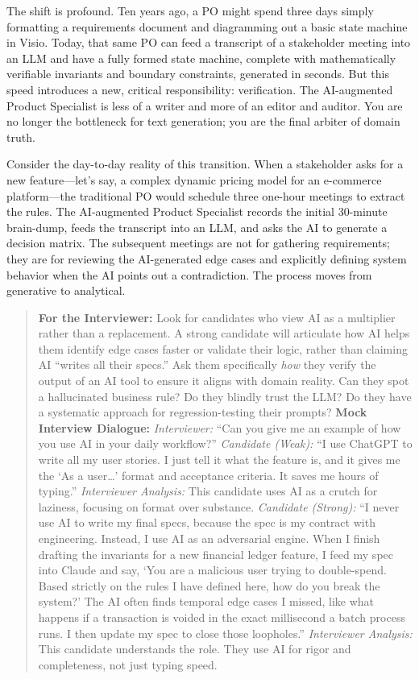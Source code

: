 The shift is profound. Ten years ago, a PO might spend three days simply
formatting a requirements document and diagramming out a basic state
machine in Visio. Today, that same PO can feed a transcript of a
stakeholder meeting into an LLM and have a fully formed state machine,
complete with mathematically verifiable invariants and boundary
constraints, generated in seconds. But this speed introduces a new,
critical responsibility: verification. The AI-augmented Product
Specialist is less of a writer and more of an editor and auditor. You
are no longer the bottleneck for text generation; you are the final
arbiter of domain truth.

Consider the day-to-day reality of this transition. When a stakeholder
asks for a new feature---let's say, a complex dynamic pricing model for
an e-commerce platform---the traditional PO would schedule three
one-hour meetings to extract the rules. The AI-augmented Product
Specialist records the initial 30-minute brain-dump, feeds the
transcript into an LLM, and asks the AI to generate a decision matrix.
The subsequent meetings are not for gathering requirements; they are for
reviewing the AI-generated edge cases and explicitly defining system
behavior when the AI points out a contradiction. The process moves from
generative to analytical.

\begin{quote}
\textbf{For the Interviewer:} Look for candidates who view AI as a
multiplier rather than a replacement. A strong candidate will articulate
how AI helps them identify edge cases faster or validate their logic,
rather than claiming AI ``writes all their specs.'' Ask them
specifically \emph{how} they verify the output of an AI tool to ensure
it aligns with domain reality. Can they spot a hallucinated business
rule? Do they blindly trust the LLM? Do they have a systematic approach
for regression-testing their prompts? \textbf{Mock Interview Dialogue:}
\emph{Interviewer:} ``Can you give me an example of how you use AI in
your daily workflow?'' \emph{Candidate (Weak):} ``I use ChatGPT to write
all my user stories. I just tell it what the feature is, and it gives me
the `As a user\ldots{}' format and acceptance criteria. It saves me
hours of typing.'' \emph{Interviewer Analysis:} This candidate uses AI
as a crutch for laziness, focusing on format over substance.
\emph{Candidate (Strong):} ``I never use AI to write my final specs,
because the spec is my contract with engineering. Instead, I use AI as
an adversarial engine. When I finish drafting the invariants for a new
financial ledger feature, I feed my spec into Claude and say, `You are a
malicious user trying to double-spend. Based strictly on the rules I
have defined here, how do you break the system?' The AI often finds
temporal edge cases I missed, like what happens if a transaction is
voided in the exact millisecond a batch process runs. I then update my
spec to close those loopholes.'' \emph{Interviewer Analysis:} This
candidate understands the role. They use AI for rigor and completeness,
not just typing speed.
\end{quote}

